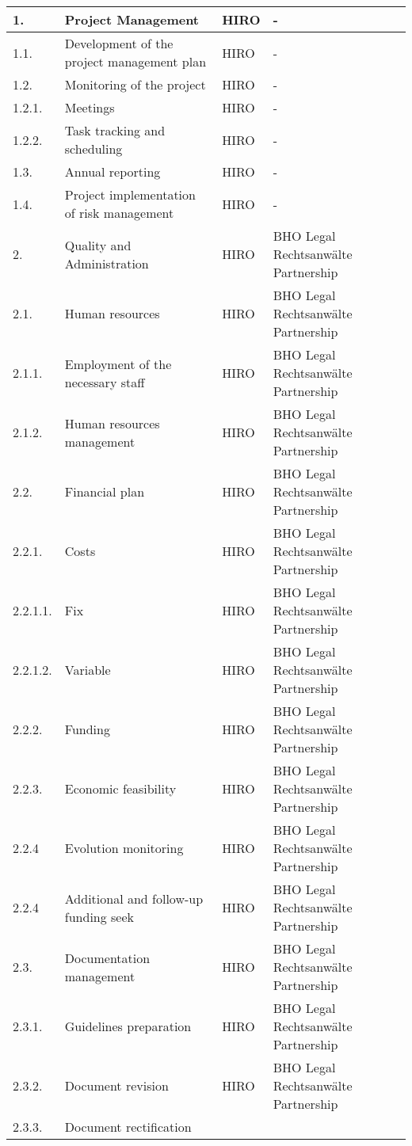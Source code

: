 \begin{longtable}[H]{l p{4cm} p{3.8cm} p{4cm}}
	1. & Project Management &HIRO&-
	\\  \midrule
	1.1. & Development of the project management plan &
	HIRO&-
	\\ \midrule
	1.2. & Monitoring of the project & 
	HIRO&-\\ \midrule
	1.2.1. & Meetings &
	HIRO&-
	\\ \midrule
	1.2.2. & Task tracking and scheduling &
	HIRO&-
	\\ \midrule
	1.3. & Annual reporting &
	HIRO&-
	\\ \midrule
	1.4. & Project implementation of risk management & 
	HIRO&-
	\\ \midrule
	2. & Quality and Administration & 
	HIRO&BHO Legal Rechtsanwälte Partnership
	\\ \midrule
	2.1. & Human resources &
	HIRO&BHO Legal Rechtsanwälte Partnership
	\\ \midrule
	2.1.1. & Employment of the necessary staff & 
	HIRO&BHO Legal Rechtsanwälte Partnership
	\\ \midrule
	2.1.2. & Human resources management &
	HIRO&BHO Legal Rechtsanwälte Partnership
	\\ \midrule
	2.2. & Financial plan &
	HIRO&BHO Legal Rechtsanwälte Partnership
	\\ \midrule
	2.2.1. & Costs &
	HIRO&BHO Legal Rechtsanwälte Partnership
	\\ \midrule
	2.2.1.1. & Fix &
	HIRO&BHO Legal Rechtsanwälte Partnership
	\\ \midrule
	2.2.1.2. & Variable &
	HIRO&BHO Legal Rechtsanwälte Partnership
	\\ \midrule
	2.2.2. & Funding &
	HIRO&BHO Legal Rechtsanwälte Partnership
	\\ \midrule
	2.2.3. & Economic feasibility &
	HIRO&BHO Legal Rechtsanwälte Partnership
	\\ \midrule
	2.2.4 & Evolution monitoring &
	HIRO&BHO Legal Rechtsanwälte Partnership
	\\ \midrule
	2.2.4 & Additional and follow-up funding seek &
	HIRO&BHO Legal Rechtsanwälte Partnership
	\\ \midrule
	2.3. & Documentation management &
	HIRO&BHO Legal Rechtsanwälte Partnership
	\\ \midrule
	2.3.1. & Guidelines preparation &
	HIRO&BHO Legal Rechtsanwälte Partnership
	\\ \midrule
	2.3.2. & Document revision &
	HIRO&BHO Legal Rechtsanwälte Partnership
	\\ \midrule
	2.3.3. & Document rectification &

\end{longtable}
